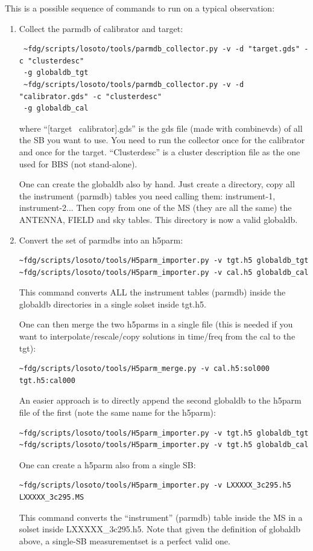\documentclass[]{article}
\begin{document}
This is a possible sequence of commands to run \losoto{} on a typical observation:
\begin{enumerate}

\item Collect the parmdb of calibrator and target:
\begin{verbatim}
 ~fdg/scripts/losoto/tools/parmdb_collector.py -v -d "target.gds" -c "clusterdesc"
 -g globaldb_tgt
 ~fdg/scripts/losoto/tools/parmdb_collector.py -v -d "calibrator.gds" -c "clusterdesc"
 -g globaldb_cal
\end{verbatim}
where ``[target \textbar\ calibrator].gds'' is the gds file (made with combinevds) of all the SB you want to use. You need to run the collector once for the calibrator and once for the target. ``Clusterdesc'' is a cluster description file as the one used for BBS (not stand-alone).

One can create the globaldb also by hand. Just create a directory, copy all the instrument (parmdb) tables you need calling them: instrument-1, instrument-2... Then copy from one of the MS (they are all the same) the ANTENNA, FIELD and sky tables. This directory is now a valid globaldb.

\item Convert the set of parmdbs into an h5parm:
\begin{verbatim}
~fdg/scripts/losoto/tools/H5parm_importer.py -v tgt.h5 globaldb_tgt
~fdg/scripts/losoto/tools/H5parm_importer.py -v cal.h5 globaldb_cal
\end{verbatim}
This command converts ALL the instrument tables (parmdb) inside the globaldb directories in a single solset inside tgt.h5.

One can then merge the two h5parms in a single file (this is needed if you want to interpolate/rescale/copy solutions in time/freq from the cal to the tgt):
\begin{verbatim}
~fdg/scripts/losoto/tools/H5parm_merge.py -v cal.h5:sol000 tgt.h5:cal000
\end{verbatim}

An easier approach is to directly append the second globaldb to the h5parm file of the first (note the same name for the h5parm):
\begin{verbatim}
~fdg/scripts/losoto/tools/H5parm_importer.py -v tgt.h5 globaldb_tgt
~fdg/scripts/losoto/tools/H5parm_importer.py -v tgt.h5 globaldb_cal
\end{verbatim}

One can create a h5parm also from a single SB:
\begin{verbatim}
~fdg/scripts/losoto/tools/H5parm_importer.py -v LXXXXX_3c295.h5 LXXXXX_3c295.MS
\end{verbatim}
This command converts the ``instrument'' (parmdb) table inside the MS in a solset inside LXXXXX\_3c295.h5. Note that given the definition of globaldb above, a single-SB measurementset is a perfect valid one.


\end{enumerate}
\end{document}
